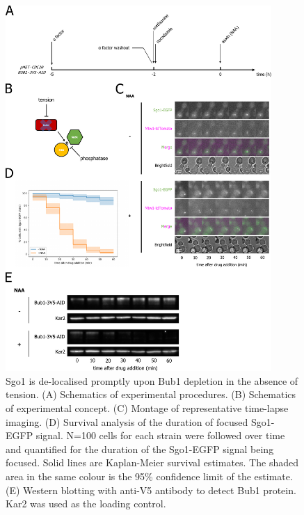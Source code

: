 
\begin{figure}[htbp]
  \centering
  \includegraphics[width=0.9\textwidth]{chapter3/figures/Bub1-3V5-AID.pdf}
  \caption[Sgo1 is de-localised promptly upon Bub1 depletion in the absence of tension]{Sgo1 is de-localised promptly upon Bub1 depletion in the absence of tension. (A) Schematics of experimental procedures. (B) Schematics of experimental concept. (C) Montage of representative time-lapse imaging. (D) Survival analysis of the duration of focused Sgo1-EGFP signal. N=100 cells for each strain were followed over time and quantified for the duration of the Sgo1-EGFP signal being focused. Solid lines are Kaplan-Meier survival estimates. The shaded area in the same colour is the 95\% confidence limit of the estimate. (E) Western blotting with anti-V5 antibody to detect Bub1 protein. Kar2 was used as the loading control.}
  \label{fig:bub1aid}
\end{figure} 

